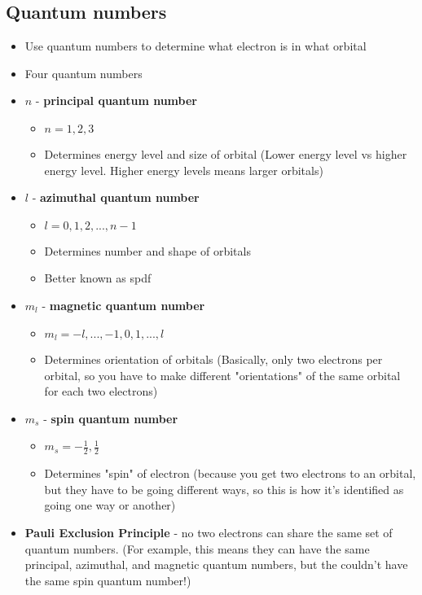 \documentclass[letterpaper, 12pt]{article}
\begin{document}
	\subsection{Quantum numbers}
	\begin{itemize}
		\item Use quantum numbers to determine what electron is in what orbital
		\item Four quantum numbers
		\item \textbf{$n$} - \textbf{principal quantum number}
		\begin{itemize}
			\item $n = 1, 2, 3$
			\item Determines energy level and size of orbital (Lower energy level vs higher energy level. Higher energy levels means larger orbitals)
		\end{itemize}
		\item \textbf{$l$} - \textbf{azimuthal quantum number}
		\begin{itemize}
			\item $l = 0, 1, 2, ..., n-1$
			\item Determines number and shape of orbitals
			\item Better known as spdf
		\end{itemize}
		\item \textbf{$m_{l}$} - \textbf{magnetic quantum number}
		\begin{itemize}
			\item $m_{l} = -l, ..., -1, 0, 1, ..., l$
			\item Determines orientation of orbitals (Basically, only two electrons per orbital, so you have to make different "orientations" of the same orbital for each two electrons)
		\end{itemize}
		\item \textbf{$m_{s}$} - \textbf{spin quantum number}
		\begin{itemize}
			\item $m_{s} = -\frac{1}{2}, \frac{1}{2}$
			\item Determines "spin" of electron (because you get two electrons to an orbital, but they have to be going different ways, so this is how it's identified as going one way or another)
		\end{itemize}
		\item \textbf{Pauli Exclusion Principle} - no two electrons can share the same set of quantum numbers. (For example, this means they can have the same principal, azimuthal, and magnetic quantum numbers, but the couldn't have the same spin quantum number!)
	\end{itemize}
\clearpage
\end{document}
